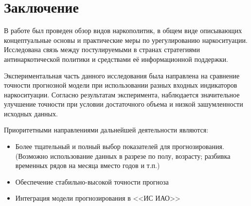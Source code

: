 \documentclass[a4paper,14pt]{article}
\begin{document}
\newpage
\section*{Заключение}
В работе был проведен обзор видов наркополитик, в общем виде описывающих концептуальные основы и практические меры по урегулированию наркоситуации. 
Исследована связь между постулируемыми в странах стратегиями антинаркотической политики и средствами её информационной поддержки.

Экспериментальная часть данного исследования была направлена на сравнение точности прогнозной модели при использовании разных входных индикаторов наркоситуации.  Согласно результатам эксперимента, наблюдается значительное улучшение точности при условии достаточного объема и низкой зашумленности исходных данных. 

Приоритетными направлениями дальнейшей деятельности являются:
\begin{itemize}
	\item Более тщательный и полный выбор показателей для прогнозирования. (Возможно использование данных в разрезе по полу, возрасту; разбивка временных рядов на месяца вместо годов и т.п.)
	\item Обеспечение стабильно-высокой точности прогноза
	\item Интеграция модели прогнозирования в <<ИС ИАО>>
	 
	
\end{itemize}



\newpage
\printbibliography[heading=bibintoc]
\end{document}
